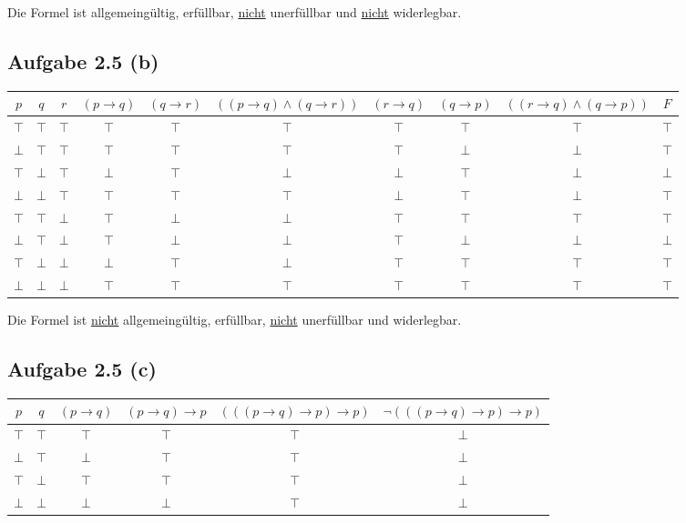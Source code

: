 \documentclass[12pt,a4paper]{article}
\begin{document}
Die Formel ist allgemeingültig, erfüllbar, \underline{nicht} unerfüllbar und \underline{nicht} widerlegbar.

\subsection*{Aufgabe 2.5 (b)}
\begin{landscape}
\begin{tabular}{c|c|c||c|c|c|c|c|c|c}
$p$ & $q$ & $r$ & $(p\to q)$ & $(q\to r)$ & $((p\to q)\wedge(q\to r))$ & $(r\to q)$ & $(q\to p)$ & $((r\to q)\wedge(q\to p))$ & $F$ \\ \hline
$\top$ & $\top$ & $\top$ & $\top$ & $\top$ & $\top$ & $\top$ & $\top$ & $\top$ & $\top$\\
$\bot$ & $\top$ & $\top$ & $\top$ & $\top$ & $\top$ & $\top$ & $\bot$ & $\bot$ & $\top$\\
$\top$ & $\bot$ & $\top$ & $\bot$ & $\top$ & $\bot$ & $\bot$ & $\top$ & $\bot$ & $\bot$\\
$\bot$ & $\bot$ & $\top$ & $\top$ & $\top$ & $\top$ & $\bot$ & $\top$ & $\bot$ & $\top$\\ \hline
$\top$ & $\top$ & $\bot$ & $\top$ & $\bot$ & $\bot$ & $\top$ & $\top$ & $\top$ & $\top$\\
$\bot$ & $\top$ & $\bot$ & $\top$ & $\bot$ & $\bot$ & $\top$ & $\bot$ & $\bot$ & $\bot$\\
$\top$ & $\bot$ & $\bot$ & $\bot$ & $\top$ & $\bot$ & $\top$ & $\top$ & $\top$ & $\top$\\
$\bot$ & $\bot$ & $\bot$ & $\top$ & $\top$ & $\top$ & $\top$ & $\top$ & $\top$ & $\top$
\end{tabular}
\end{landscape}

Die Formel ist \underline{nicht} allgemeingültig, erfüllbar, \underline{nicht} unerfüllbar und widerlegbar.

\subsection*{Aufgabe 2.5 (c)}
\begin{tabular}{c|c||c|c|c|c}
$p$ & $q$ & $(p\to q)$ & $(p\to q)\to p$ & $(((p\to q)\to p)\to p)$ & $\neg(((p\to q)\to p)\to p)$\\ \hline
$\top$ & $\top$ & $\top$ & $\top$ & $\top$ & $\bot$\\
$\bot$ & $\top$ & $\bot$ & $\top$ & $\top$ & $\bot$\\
$\top$ & $\bot$ & $\top$ & $\top$ & $\top$ & $\bot$\\
$\bot$ & $\bot$ & $\bot$ & $\bot$ & $\top$ & $\bot$
\end{tabular}\\
\end{document}
